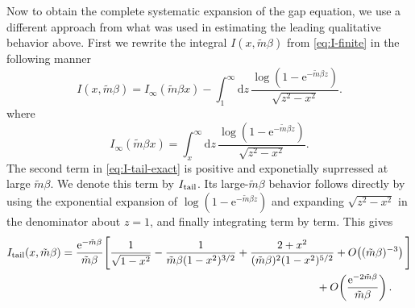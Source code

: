 \documentclass[a4paper,11pt]{article}
\newcommand{\e}{\mathrm e}
\newcommand{\dd}{\mathrm d}
\begin{document}
Now to obtain the complete systematic expansion of the gap equation, we use a different approach from what was used in estimating  the leading qualitative behavior above. First we rewrite the integral $I(x,\tilde m\beta)$ from \eqref{eq:I-finite} in the following manner
%
\begin{equation}
	I(x,\tilde m\beta)=I_\infty(\tilde m\beta x)
	-\int_1^\infty\dd z\,
	\frac{\log(1-\e^{-\tilde m\beta z})}{\sqrt{z^2-x^2}}.
	\label{eq:I-tail-exact}
\end{equation}
where
\begin{equation}
	I_\infty(\tilde m\beta x)=\int_x^\infty\dd z\,
	\frac{\log(1-\e^{-\tilde m\beta z})}{\sqrt{z^2-x^2}}.
	\label{eq:I-infty}
\end{equation}
The second term in \eqref{eq:I-tail-exact} is positive and exponetially suprressed at large $\tilde m \beta$. We  denote this term by
$I_{\rm tail}$.  Its large-$\tilde m\beta$ behavior follows directly by
using the exponential expansion of
$\log(1-\e^{-\tilde m\beta z})$ and expanding  $\sqrt{z^2-x^2}$ in the denominator about $z=1$, and finally integrating term by term. This gives
\begin{align}
	I_{\rm tail}(x,\tilde m\beta)
	={}&\frac{\e^{-\tilde m\beta}}{\tilde m\beta}
	\Bigg[
	\frac1{\sqrt{1-x^2}}
	-\frac1{\tilde m\beta(1-x^2)^{3/2}}
	+\frac{2+x^2}{(\tilde m\beta)^2(1-x^2)^{5/2}}
	+O\!\left((\tilde m\beta)^{-3}\right)
	\Bigg]\nonumber\\
	&\qquad\qquad\qquad\qquad\qquad\qquad\qquad\qquad\qquad\qquad\qquad +O\!\left(\frac{\e^{-2\tilde m\beta}}{\tilde m\beta}\right).
	\label{eq:I-tail-asymptotic}
\end{align}
\end{document}
